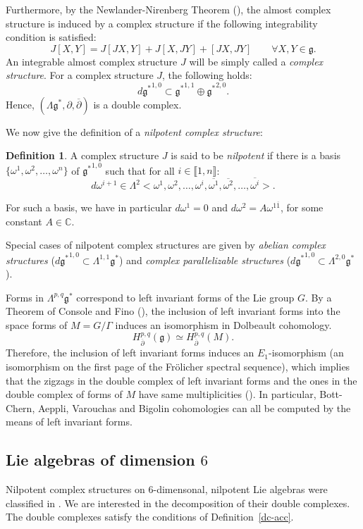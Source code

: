 \documentclass[leqno]{article}
\theoremstyle{definition}
\newtheorem{Definition}[equation]{Definition}
\numberwithin{equation}{section}
\begin{document}
Furthermore, by the Newlander-Nirenberg Theorem (\cite{NN}), the almost complex structure is induced by a complex structure if the following integrability condition is satisfied:
\[
J[X, Y]
=
J[JX, Y]
+
J[X, JY]
+
[JX, JY]
\quad \quad
\forall X, Y \in \mathfrak{g}.
\]
An integrable almost complex structure $J$ will be simply called a {\sl complex structure}.
For a complex structure $J$, the following holds:
\[
d{\mathfrak{g}^*}^{1, 0}
\subset
{\mathfrak{g}^*}^{1, 1}
\oplus
{\mathfrak{g}^*}^{2, 0}.
\]
Hence, $(\Lambda \mathfrak{g}^*, \partial, \overline{\partial})$ is a double complex.

We now give the definition of a {\sl nilpotent complex structure}:

\begin{Definition}
A complex structure $J$ is said to be {\sl nilpotent} if there is a basis $\{\omega^1, \omega^2, \dots, \omega^n\}$ of ${\mathfrak{g}^*}^{1, 0}$ such that for all $i \in \llbracket 1, n \rrbracket$:
\[
d\omega^{i+1}
\in
\Lambda^2 <\omega^1, \omega^2, \dots, \omega^i, \overline{\omega^1}, \overline{\omega^2}, \dots, \overline{\omega^i}>.
\]
\end{Definition}
For such a basis, we have in particular $d\omega^1 = 0$ and $d\omega^2 = A\omega^{1\overline{1}}$, for some constant $A \in \mathbb{C}$.

Special cases of nilpotent complex structures are given by {\sl abelian complex structures} ($d{\mathfrak{g}^*}^{1, 0} \subset \Lambda^{1, 1}\mathfrak{g}^*$) and {\sl complex parallelizable structures} ($d{\mathfrak{g}^*}^{1, 0} \subset \Lambda^{2, 0}\mathfrak{g}^*$).

Forms in $\Lambda^{p, q}\mathfrak{g}^*$ correspond to left invariant forms of the Lie group $G$. By a Theorem of Console and Fino (\cite{CF}), the inclusion of left invariant forms into the space forms of $M = G / \Gamma$ induces an isomorphism in Dolbeault cohomology.
\[
H_{\overline{\partial}}^{p, q}(\mathfrak{g})
\simeq
H_{\overline{\partial}}^{p, q}(M).
\]
Therefore, the inclusion of left invariant forms induces an $E_1$-isomorphism (an isomorphism on the first page of the Frölicher spectral sequence), which implies that the zigzags in the double complex of left invariant forms and the ones in the double complex of forms of $M$ have same multiplicities (\cite{Ste2}). In particular, Bott-Chern, Aeppli, Varouchas and Bigolin cohomologies can all be computed by the means of left invariant forms.
\subsection{Lie algebras of dimension $6$}
\label{lie6}
Nilpotent complex structures on $6$-dimensonal, nilpotent Lie algebras were classified in \cite{COUV}. We are interested in the decomposition of their double complexes. The double complexes satisfy the conditions of Definition~\ref{dc-acc}.
\end{document}
